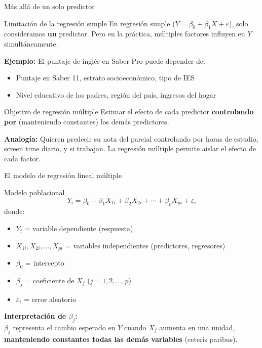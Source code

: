 \documentclass[aspectratio=169, 11pt]{beamer}
\begin{document}
\begin{frame}{M\'as all\'a de un solo predictor}
\begin{block}{Limitaci\'on de la regresi\'on simple}
En regresi\'on simple ($Y = \beta_0 + \beta_1 X + \varepsilon$), solo consideramos \textbf{un} predictor. Pero en la pr\'actica, m\'ultiples factores influyen en $Y$ simult\'aneamente.
\end{block}

\vspace{0.2cm}
\textbf{Ejemplo:} El puntaje de ingl\'es en Saber Pro puede depender de:
\begin{itemize}
  \item Puntaje en Saber 11, estrato socioecon\'omico, tipo de IES
  \item Nivel educativo de los padres, regi\'on del pa\'is, ingresos del hogar
\end{itemize}

\vspace{0.2cm}
\begin{exampleblock}{Objetivo de regresi\'on m\'ultiple}
Estimar el efecto de cada predictor \textbf{controlando por} (manteniendo constantes) los dem\'as predictores.

\smallskip
\textbf{Analog\'ia:} Quieren predecir su nota del parcial controlando por horas de estudio, screen time diario, y si trabajan. La regresi\'on m\'ultiple permite aislar el efecto de cada factor.
\end{exampleblock}
\end{frame}

\begin{frame}{El modelo de regresión lineal múltiple}
\begin{block}{Modelo poblacional}
\[
Y_i = \beta_0 + \beta_1 X_{1i} + \beta_2 X_{2i} + \cdots + \beta_p X_{pi} + \varepsilon_i
\]
donde:
\begin{itemize}
  \item $Y_i$ = variable dependiente (respuesta)
  \item $X_{1i}, X_{2i}, \ldots, X_{pi}$ = variables independientes (predictores, regresores)
  \item $\beta_0$ = intercepto
  \item $\beta_j$ = coeficiente de $X_j$ ($j = 1, 2, \ldots, p$)
  \item $\varepsilon_i$ = error aleatorio
\end{itemize}
\end{block}

\vspace{0.2cm}
\textbf{Interpretación de $\beta_j$:}\\
$\beta_j$ representa el cambio esperado en $Y$ cuando $X_j$ aumenta en una unidad, \textbf{manteniendo constantes todas las demás variables} (ceteris paribus).
\end{frame}
\end{document}
